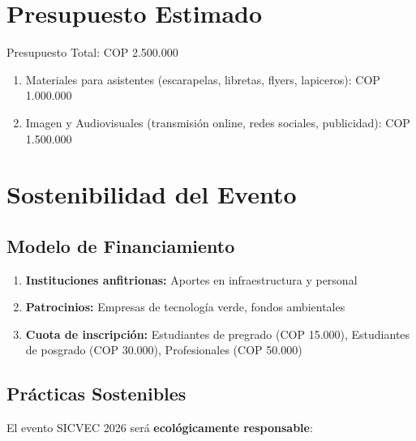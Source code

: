 \documentclass[12pt,a4paper]{article}
\begin{document}
\section{Presupuesto Estimado}

\begin{tcolorbox}[cajainfo, title=Inversión Requerida]
Presupuesto Total: COP 2.500.000

\begin{enumerate}[label={\textcolor{verdeosc}{\arabic{*}.}}]
  \item Materiales para asistentes (escarapelas, libretas, flyers, lapiceros): COP 1.000.000
  \item Imagen y Audiovisuales (transmisión online, redes sociales, publicidad): COP 1.500.000
\end{enumerate}
\end{tcolorbox}

\section{Sostenibilidad del Evento}

\subsection{Modelo de Financiamiento}

\begin{enumerate}[label={\textcolor{verdeosc}{\arabic{*}.}}]
  \item \textbf{Instituciones anfitrionas:} Aportes en infraestructura y personal
  \item \textbf{Patrocinios:} Empresas de tecnología verde, fondos ambientales
  \item \textbf{Cuota de inscripción:} Estudiantes de pregrado (COP 15.000), Estudiantes de posgrado (COP 30.000), Profesionales (COP 50.000)
\end{enumerate}

\subsection{Prácticas Sostenibles}

El evento SICVEC 2026 será \textbf{ecológicamente responsable}:
\end{document}
